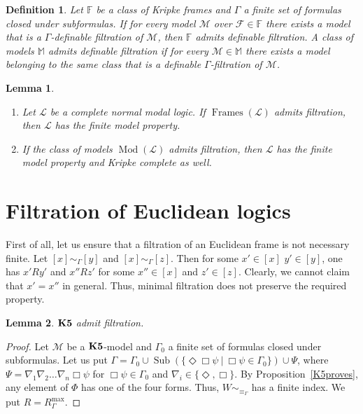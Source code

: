 \documentclass[a4paper]{article}
\theoremstyle{defin}
\newtheorem{defin}{Definition}
\theoremstyle{theorem}
\theoremstyle{prop}
\theoremstyle{lemma}
\newtheorem{lemma}{Lemma}
\theoremstyle{ex}
\theoremstyle{col}
\begin{document}
\begin{defin} Let $\mathbb{F}$ be a class of Kripke frames and $\Gamma$ a finite set of formulas closed under subformulas. If for every model $\mathcal{M}$ over $\mathcal{F} \in \mathbb{F}$ there exists a model that is a $\Gamma$-definable filtration of $\mathcal{M}$, then $\mathbb{F}$ admits definable filtration. A class of models $\mathbb{M}$ admits definable filtration if for every $\mathcal{M} \in \mathbb{M}$ there exists a model belonging to the same class that is a definable $\Gamma$-filtration of $\mathcal{M}$.
\end{defin}

\begin{lemma}
  $ $

\begin{enumerate}
  \item Let $\mathcal{L}$ be a complete normal modal logic. If $\operatorname{Frames}(\mathcal{L})$ admits filtration, then $\mathcal{L}$ has the finite model property.
  \item If the class of models $\operatorname{Mod}(\mathcal{L})$ admits filtration, then $\mathcal{L}$ has the finite model property and Kripke complete as well.
\end{enumerate}
\end{lemma}

\section{Filtration of Euclidean logics}

First of all, let us ensure that a filtration of an Euclidean frame is not necessary finite.
Let $[x] \sim_{\Gamma} [y]$ and $[x] \sim_{\Gamma} [z]$. Then for some $x' \in [x]$ $y' \in [y]$, one has
$x' R y'$ and $x'' R z'$ for some $x'' \in [x]$ and $z' \in [z]$. Clearly, we cannot claim that $x' = x''$ in general. Thus, minimal filtration does not preserve the required property.

\begin{lemma}
  ${\bf K5}$ admit filtration.
\end{lemma}

\begin{proof}
  Let $\mathcal{M}$ be a ${\bf K5}$-model and $\Gamma_0$ a finite set of formulas closed under subformulas.
  Let us put $\Gamma = \Gamma_0 \cup \operatorname{Sub}(\{ \Diamond \Box \psi \: | \: \Box \psi \in \Gamma_0 \}) \cup \Psi$, where $\Psi = \nabla_1 \nabla_2 \dots \nabla_n \Box \psi$ for $\Box \psi \in \Gamma_0$ and
  $\nabla_i \in \{ \Diamond, \Box \}$. By Proposition~\ref{K5proves}, any element of $\Phi$ has one of the four forms. Thus, $W \sim_{\equiv_{\Gamma}}$ has a finite index.
  We put $\widehat{R} = R^{\operatorname{max}}_{\Gamma}$.
\end{proof}
\end{document}
